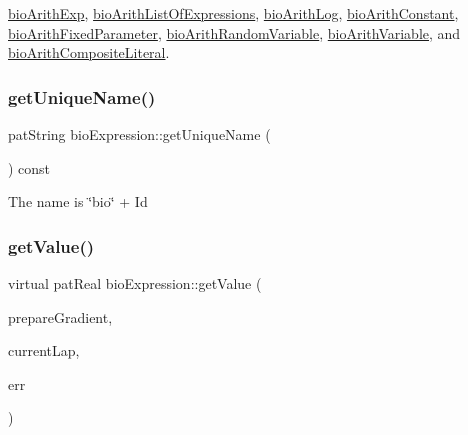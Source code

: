 \hyperlink{classbio_arith_exp_a3d2f7448252ebfb7133a3eeef866bea4}{bio\+Arith\+Exp}, \hyperlink{classbio_arith_list_of_expressions_afd5867cdac9cea54a704a075412b3c08}{bio\+Arith\+List\+Of\+Expressions}, \hyperlink{classbio_arith_log_aff0739f0c0576b9e70b7192e3e5baf2a}{bio\+Arith\+Log}, \hyperlink{classbio_arith_constant_a521fe691fd4efd9f93ff95a0e478148d}{bio\+Arith\+Constant}, \hyperlink{classbio_arith_fixed_parameter_a0743b72d00d4f769ec3c01faae8ebac8}{bio\+Arith\+Fixed\+Parameter}, \hyperlink{classbio_arith_random_variable_a970e51cefe17a32b0c752e8bef35285f}{bio\+Arith\+Random\+Variable}, \hyperlink{classbio_arith_variable_a5b2185aabcab07bcd474479f8ca7dd94}{bio\+Arith\+Variable}, and \hyperlink{classbio_arith_composite_literal_a99216fa86facca3b310a985c69116136}{bio\+Arith\+Composite\+Literal}.

\mbox{\label{classbio_expression_aa19617e73907e73780d148c5ce5e6ee5}} 
\subsubsection{\texorpdfstring{get\+Unique\+Name()}{getUniqueName()}}
{\footnotesize\ttfamily pat\+String bio\+Expression\+::get\+Unique\+Name (\begin{DoxyParamCaption}{ }\end{DoxyParamCaption}) const}

The name is \char`\"{}bio\char`\"{} + Id \mbox{\label{classbio_expression_af58662a5d4d456f15bc4f2c9bd4f8a5b}} 
\subsubsection{\texorpdfstring{get\+Value()}{getValue()}}
{\footnotesize\ttfamily virtual pat\+Real bio\+Expression\+::get\+Value (\begin{DoxyParamCaption}\item[{pat\+Boolean}]{prepare\+Gradient,  }\item[{pat\+U\+Long}]{current\+Lap,  }\item[{pat\+Error $\ast$\&}]{err }\end{DoxyParamCaption})\hspace{0.3cm}{\ttfamily [virtual]}}

